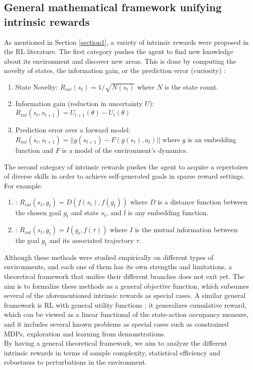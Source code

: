 \documentclass{article}
\begin{document}
\subsection{General mathematical framework unifying intrinsic rewards}
As mentioned in Section \ref{section1}, a variety of intrinsic rewards were proposed in the RL literature. The first category pushes the agent to find new knowledge about its environment and discover new areas. This is done  by computing the novelty of states, the information gain, or the prediction error (curiosity) \cite{aubret2019survey}:
\begin{enumerate}
    \item State Novelty: $R_{int}(s_t)=1/\sqrt{N(s_t)}$ where $N$ is the state count.
    \item Information gain (reduction in uncertainty $U$): $R_{int}(s_t,s_{t+1})= U_{t+1}(\theta) - U_t(\theta)$
    \item Prediction error over a forward model: $R_{int}(s_t,s_{t+1})= ||g(s_{t+1}) - F(g(s_t),a_t)||$ where $g$ is an embedding function and $F$ is a model of the environment's dynamics. 
\end{enumerate}
The second category of intrinsic rewards pushes the agent to acquire a repertoires of diverse skills in order to achieve self-generated goals in sparse reward settings. For example: 
\begin{enumerate}
    \item: $R_{int}(s_t,g_t)= D(f(s_t),f(g_t))$ where $D$ is a distance function between the chosen goal $g_t$ and state $s_t$, and f is any embedding function.
    \item: $R_{int}(s_t,g_t)= I(g_t,f(\tau ))$ where $I$ is the mutual information between the goal $g_t$ and its associated trajectory $\tau$.
\end{enumerate}
Although these methods were studied empirically on different types of environments, and each one of them has its own strengths and limitations, a theoretical framework that unifies their different branches does not exit yet. The aim is to formalize these methods as a general objective function, which subsumes several of the aforementioned intrinsic rewards as special cases. A similar general framework is RL with general utility functions \cite{zhang2020variational,zahavy2021reward}; it generalizes cumulative reward, which can be viewed as a linear functional of the state-action occupancy measure, and it includes several known problems as special cases such as constrained MDPs, exploration and learning from demonstrations. \\
By having a general theoretical framework, we aim to analyze the different intrinsic rewards in terms of sample complexity, statistical efficiency and robustness to perturbations in the environment. 
\end{document}
